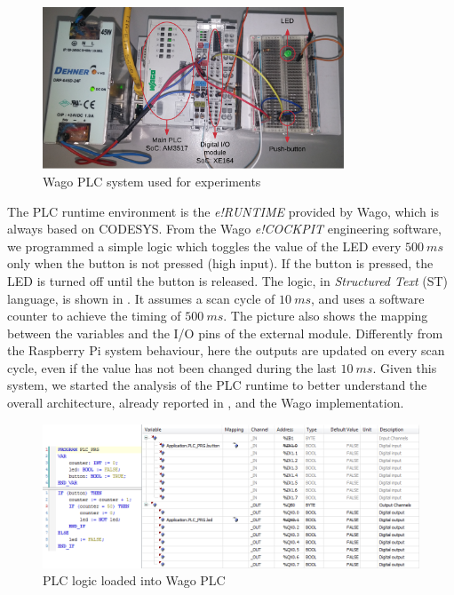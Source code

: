 \begin{figure}[h]
\centerline{\includegraphics[width=0.8\textwidth]{res/plc-system}}
\caption{Wago PLC system used for experiments \label{fig:plc-system}}
\end{figure}

The PLC runtime environment is the \emph{e!RUNTIME} provided by Wago, which is always based on CODESYS. From the Wago \emph{e!COCKPIT} engineering software,
we programmed a simple logic which toggles the value of the LED every $\SI{500}{ms}$ only when the button is not pressed (high input). If the button is pressed,
the LED is turned off until the button is released. The logic, in \emph{Structured Text} (ST) language, is shown in .
It assumes a scan cycle of $\SI{10}{ms}$, and uses a software counter to achieve the timing of $\SI{500}{ms}$. The picture also shows the mapping between the variables
and the I/O pins of the external module. Differently from the Raspberry Pi system behaviour, here the outputs are updated on every scan cycle, even if the value has not been changed
during the last $\SI{10}{ms}$.
Given this system, we started the analysis of the PLC runtime to better understand the overall architecture, already reported in , and the Wago implementation.

\begin{figure}[h]
\centerline{\includegraphics[width=\textwidth]{res/plc-logic}}
\caption{PLC logic loaded into Wago PLC \label{fig:plc-logic}}
\end{figure}


